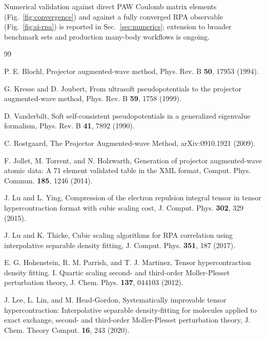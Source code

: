 \documentclass[aps,prb,reprint,superscriptaddress,longbibliography,nofootinbib]{revtex4-2}
\begin{document}
\begin{acknowledgments}
Numerical validation against direct PAW Coulomb matrix elements
(Fig.~\ref{fig:convergence}) and against a fully converged RPA observable
(Fig.~\ref{fig:si-rpa}) is reported in Sec.~\ref{sec:numerics}; extension to
broader benchmark sets and production many-body workflows is ongoing.
\end{acknowledgments}

\begin{thebibliography}{99}

P. E. Blochl, Projector augmented-wave method, Phys. Rev. B \textbf{50}, 17953 (1994).

G. Kresse and D. Joubert, From ultrasoft pseudopotentials to the projector augmented-wave method, Phys. Rev. B \textbf{59}, 1758 (1999).

D. Vanderbilt, Soft self-consistent pseudopotentials in a generalized eigenvalue formalism, Phys. Rev. B \textbf{41}, 7892 (1990).

C. Rostgaard, The Projector Augmented-wave Method, arXiv:0910.1921 (2009).

F. Jollet, M. Torrent, and N. Holzwarth, Generation of projector augmented-wave atomic data: A 71 element validated table in the XML format, Comput. Phys. Commun. \textbf{185}, 1246 (2014).

J. Lu and L. Ying, Compression of the electron repulsion integral tensor in tensor hypercontraction format with cubic scaling cost, J. Comput. Phys. \textbf{302}, 329 (2015).

J. Lu and K. Thicke, Cubic scaling algorithms for RPA correlation using interpolative separable density fitting, J. Comput. Phys. \textbf{351}, 187 (2017).

E. G. Hohenstein, R. M. Parrish, and T. J. Martinez, Tensor hypercontraction density fitting. I. Quartic scaling second- and third-order Moller-Plesset perturbation theory, J. Chem. Phys. \textbf{137}, 044103 (2012).

J. Lee, L. Lin, and M. Head-Gordon, Systematically improvable tensor hypercontraction: Interpolative separable density-fitting for molecules applied to exact exchange, second- and third-order Moller-Plesset perturbation theory, J. Chem. Theory Comput. \textbf{16}, 243 (2020).


\end{thebibliography}
\end{document}
